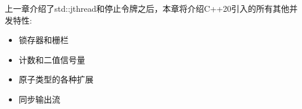 
上一章介绍了std::jthread和停止令牌之后，本章将介绍C++20引入的所有其他并发特性:

\begin{itemize}
\item
锁存器和栅栏

\item
计数和二值信号量

\item
原子类型的各种扩展

\item
同步输出流
\end{itemize}